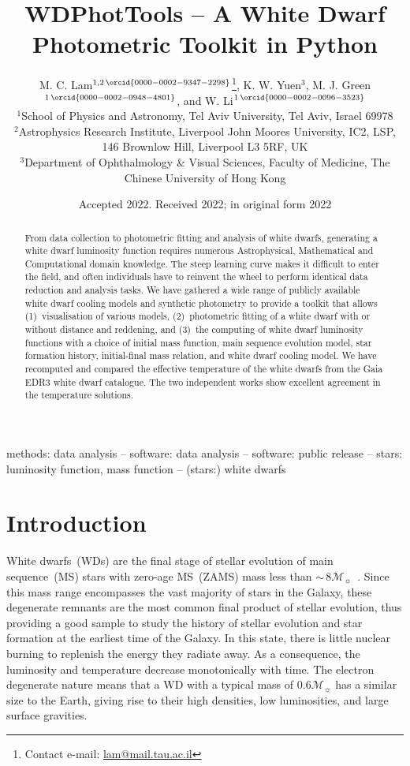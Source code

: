 \documentclass[fleqn,usenatbib]{rasti}
\title[WD Photometric Toolkit]{WDPhotTools -- A White Dwarf Photometric Toolkit in Python}
\author[M. C. Lam et al.]{
M. C. Lam$^{1, 2\,\orcid{0000-0002-9347-2298}}$\thanks{Contact e-mail: \href{mailto:lam@mail.tau.ac.il}{lam@mail.tau.ac.il}},
K. W. Yuen$^{3}$,
M. J. Green$^{1\,\orcid{0000-0002-0948-4801}}$, and
W. Li$^{1\,\orcid{0000-0002-0096-3523}}$\\
$^{1}$School of Physics and Astronomy, Tel Aviv University, Tel Aviv, Israel 69978\\
$^{2}$Astrophysics Research Institute, Liverpool John Moores University, IC2, LSP, 146 Brownlow Hill, Liverpool L3 5RF, UK\\
$^{3}$Department of Ophthalmology \& Visual Sciences, Faculty of Medicine, The Chinese University of Hong Kong
}
\date{Accepted 2022. Received 2022; in original form 2022}
\newcommand{\msun}{\mathcal{M}_{\sun}}
\begin{document}
\label{firstpage}
\pagerange{\pageref{firstpage}--\pageref{lastpage}}
\maketitle

\begin{abstract}
From data collection to photometric fitting and analysis of white dwarfs,
generating a white dwarf luminosity function requires numerous Astrophysical,
Mathematical and Computational domain knowledge. The steep learning curve makes
it difficult to enter the field, and often individuals have to reinvent the wheel
to perform identical data reduction and analysis tasks. We have gathered a wide
range of publicly available white dwarf cooling models and synthetic photometry
to provide a toolkit that allows (1)~visualisation of various models,
(2)~photometric fitting of a white dwarf with or without distance and reddening,
and (3)~the computing of white dwarf luminosity functions with a choice of
initial mass function, main sequence evolution model, star formation history,
initial-final mass relation, and white dwarf cooling model. We have recomputed
and compared the effective temperature of the white dwarfs from the Gaia EDR3
white dwarf catalogue. The two independent works show excellent agreement in
the temperature solutions.
\end{abstract}

\begin{keywords}
methods: data analysis -- software: data analysis -- software: public release -- stars: luminosity function, mass function -- (stars:) white dwarfs
\end{keywords}


\section{Introduction}
White dwarfs~(WDs) are the final stage of stellar evolution of main
sequence~(MS) stars with zero-age MS~(ZAMS) mass less than
$\sim$\,$8\msun$~\citep{2013sse..book.....K}. Since this
mass range encompasses the vast majority of stars in the Galaxy, these
degenerate remnants are the most common final product of stellar evolution,
thus providing a good sample to study the history of stellar evolution and star
formation at the earliest time of the Galaxy. In this state,
there is little nuclear burning to replenish the energy they radiate away. As a
consequence, the luminosity and temperature decrease monotonically with time.
The electron degenerate nature means that a WD with a typical mass of
$0.6\mathcal{M}_{\sun}$ has a similar size to the Earth, giving rise to their
high densities, low luminosities, and large surface gravities.
\end{document}
